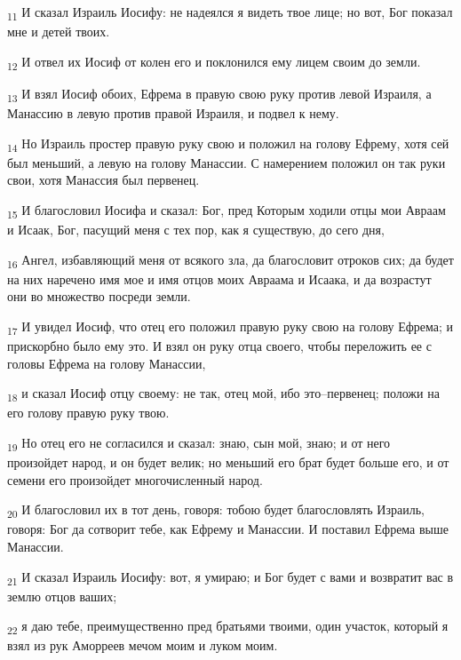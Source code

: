 \begin{tcolorbox}
\textsubscript{11} И сказал Израиль Иосифу: не надеялся я видеть твое лице; но вот, Бог показал мне и детей твоих.
\end{tcolorbox}
\begin{tcolorbox}
\textsubscript{12} И отвел их Иосиф от колен его и поклонился ему лицем своим до земли.
\end{tcolorbox}
\begin{tcolorbox}
\textsubscript{13} И взял Иосиф обоих, Ефрема в правую свою руку против левой Израиля, а Манассию в левую против правой Израиля, и подвел к нему.
\end{tcolorbox}
\begin{tcolorbox}
\textsubscript{14} Но Израиль простер правую руку свою и положил на голову Ефрему, хотя сей был меньший, а левую на голову Манассии. С намерением положил он так руки свои, хотя Манассия был первенец.
\end{tcolorbox}
\begin{tcolorbox}
\textsubscript{15} И благословил Иосифа и сказал: Бог, пред Которым ходили отцы мои Авраам и Исаак, Бог, пасущий меня с тех пор, как я существую, до сего дня,
\end{tcolorbox}
\begin{tcolorbox}
\textsubscript{16} Ангел, избавляющий меня от всякого зла, да благословит отроков сих; да будет на них наречено имя мое и имя отцов моих Авраама и Исаака, и да возрастут они во множество посреди земли.
\end{tcolorbox}
\begin{tcolorbox}
\textsubscript{17} И увидел Иосиф, что отец его положил правую руку свою на голову Ефрема; и прискорбно было ему это. И взял он руку отца своего, чтобы переложить ее с головы Ефрема на голову Манассии,
\end{tcolorbox}
\begin{tcolorbox}
\textsubscript{18} и сказал Иосиф отцу своему: не так, отец мой, ибо это--первенец; положи на его голову правую руку твою.
\end{tcolorbox}
\begin{tcolorbox}
\textsubscript{19} Но отец его не согласился и сказал: знаю, сын мой, знаю; и от него произойдет народ, и он будет велик; но меньший его брат будет больше его, и от семени его произойдет многочисленный народ.
\end{tcolorbox}
\begin{tcolorbox}
\textsubscript{20} И благословил их в тот день, говоря: тобою будет благословлять Израиль, говоря: Бог да сотворит тебе, как Ефрему и Манассии. И поставил Ефрема выше Манассии.
\end{tcolorbox}
\begin{tcolorbox}
\textsubscript{21} И сказал Израиль Иосифу: вот, я умираю; и Бог будет с вами и возвратит вас в землю отцов ваших;
\end{tcolorbox}
\begin{tcolorbox}
\textsubscript{22} я даю тебе, преимущественно пред братьями твоими, один участок, который я взял из рук Аморреев мечом моим и луком моим.
\end{tcolorbox}
